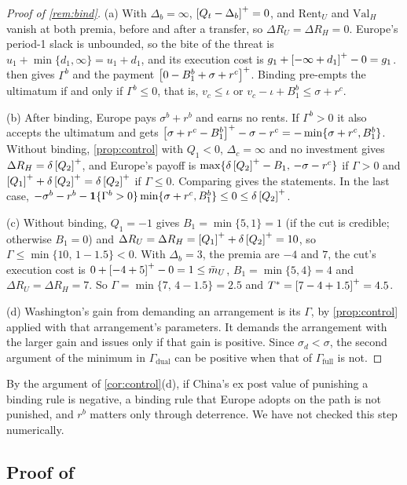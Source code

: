 \begin{proof}[Proof of \cref{rem:bind}]
(a) With $\Delta_b=\infty$, $\left[Q_t-\Delta_b\right]^{+}=0$, and $\mathrm{Rent}_U$ and $\mathrm{Val}_H$ vanish at both premia, before and after a transfer, so $\Delta R_U=\Delta R_H=0$. Europe's period-1 slack is unbounded, so the bite of the threat is $u_1+\min\{d_1,\infty\}=u_1+d_1$, and its execution cost is $g_1+\left[-\infty+d_1\right]^{+}-0=g_1$.  then gives $\Gamma^b$ and the payment $\left[0-B_1^b+\sigma+r^c\right]^{+}$. Binding pre-empts the ultimatum if and only if $\Gamma^b\le 0$, that is, $v_c\le\iota$ or $v_c-\iota+B^b_1\le\sigma+r^c$.

(b) After binding, Europe pays $\sigma^b+r^b$ and earns no rents. If $\Gamma^b>0$ it also accepts the ultimatum and gets $\left[\sigma+r^c-B_1^b\right]^{+}-\sigma-r^c=-\min\{\sigma+r^c,B_1^b\}$. Without binding, \cref{prop:control} with $Q_1<0$, $\Delta_c=\infty$ and no investment gives $\Delta R_H=\delta\left[Q_2\right]^{+}$, and Europe's payoff is $\max\{\delta\left[Q_2\right]^{+}-B_1,\,-\sigma-r^c\}$ if $\Gamma>0$ and $\left[Q_1\right]^{+}+\delta\left[Q_2\right]^{+}=\delta\left[Q_2\right]^{+}$ if $\Gamma\le 0$. Comparing gives the statements. In the last case, $-\sigma^b-r^b-\mathbf 1\{\Gamma^b>0\}\min\{\sigma+r^c,B^b_1\}\le 0\le\delta\left[Q_2\right]^{+}$.

(c) Without binding, $Q_1=-1$ gives $B_1=\min\{5,1\}=1$ (if the cut is credible; otherwise $B_1=0$) and $\Delta R_U=\Delta R_H=\left[Q_1\right]^{+}+\delta\left[Q_2\right]^{+}=10$, so $\Gamma\le\min\{10,\,1-1.5\}<0$. With $\Delta_b=3$, the premia are $-4$ and $7$, the cut's execution cost is $0+\left[-4+5\right]^{+}-0=1\le\bar m_U$, $B_1=\min\{5,4\}=4$ and $\Delta R_U=\Delta R_H=7$. So $\Gamma=\min\{7,\,4-1.5\}=2.5$ and $T^*=\left[7-4+1.5\right]^{+}=4.5$.

(d) Washington's gain from demanding an arrangement is its $\Gamma$, by \cref{prop:control} applied with that arrangement's parameters. It demands the arrangement with the larger gain and issues only if that gain is positive. Since $\sigma_d<\sigma$, the second argument of the minimum in $\Gamma_{\mathrm{dual}}$ can be positive when that of $\Gamma_{\mathrm{full}}$ is not.
\end{proof}

By the argument of \cref{cor:control}(d), if China's ex post value of punishing a binding rule is negative, a binding rule that Europe adopts on the path is not punished, and $r^b$ matters only through deterrence. We have not checked this step numerically.

\subsection{Proof of \texorpdfstring{}{breakdown}}

